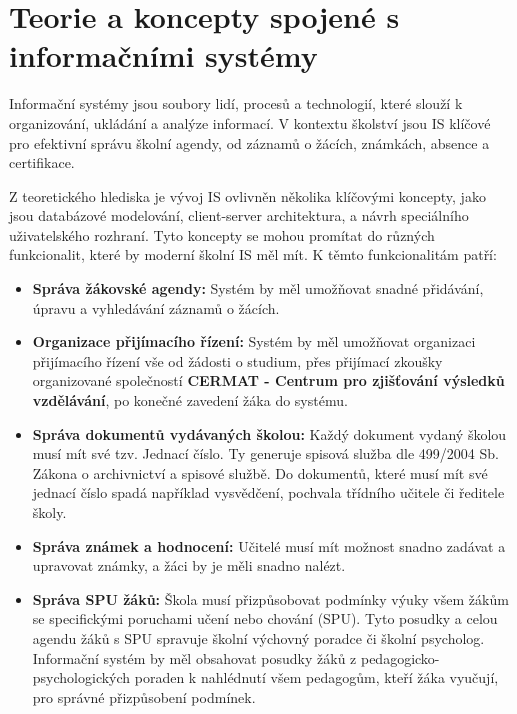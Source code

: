 \documentclass[FM,Proj]{tulthesis}
\begin{document}
\section{Teorie a koncepty spojené s informačními systémy}
Informační systémy jsou soubory lidí, procesů a technologií, které slouží k
organizování, ukládání a analýze informací. V kontextu školství jsou
IS klíčové pro efektivní správu školní agendy, od záznamů o žácích, 
známkách, absence a certifikace.

Z teoretického hlediska je vývoj IS ovlivněn několika klíčovými
koncepty, jako jsou databázové modelování, client-server architektura, a návrh speciálního
uživatelského rozhraní. Tyto koncepty se mohou promítat do různých funkcionalit, 
které by moderní školní IS měl mít. K těmto funkcionalitám patří:

\begin{itemize}
    \item \textbf{Správa žákovské agendy:} Systém by měl umožňovat snadné přidávání, úpravu a vyhledávání záznamů o žácích.
    
    \item \textbf{Organizace přijímacího řízení:} Systém by měl umožňovat organizaci přijímacího řízení vše od 
    žádosti o studium, přes přijímací zkoušky organizované společností \textbf{CERMAT - Centrum pro zjišťování 
    výsledků vzdělávání}, po konečné zavedení žáka do systému.
    
    \item \textbf{Správa dokumentů vydávaných školou:} Každý dokument vydaný školou musí mít své tzv. Jednací číslo.
    Ty generuje spisová služba dle 499/2004 Sb. Zákona o archivnictví a spisové službě. Do dokumentů, které musí mít
    své jednací číslo spadá například vysvědčení, pochvala třídního učitele či ředitele školy.

    \item \textbf{Správa známek a hodnocení:} Učitelé musí mít možnost snadno zadávat a upravovat známky, 
    a žáci by je měli snadno nalézt.

    \item \textbf{Správa SPU žáků:} Škola musí přizpůsobovat podmínky výuky všem žákům se specifickými poruchami učení
    nebo chování (SPU). Tyto posudky a celou agendu žáků s SPU spravuje školní výchovný poradce či školní psycholog.
    Informační systém by měl obsahovat posudky žáků z pedagogicko-psychologických poraden k nahlédnutí všem pedagogům, 
    kteří žáka vyučují, pro správné přizpůsobení podmínek.


\end{itemize}
\end{document}
